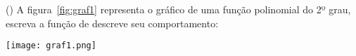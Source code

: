 \begin{question}[type=exam] () %
A figura~\ref{fig:graf1} representa o gráfico de uma função polinomial do 2º grau, escreva a função de descreve seu comportamento:

    \begingroup %
        \centering
        \texttt{[image: graf1.png]}
        \label{fig:graf1}
    \endgroup

\end{question}


   